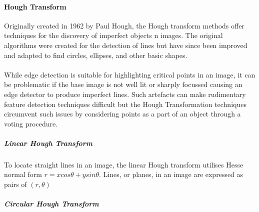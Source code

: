 	\paragraph{Hough Transform}\label{sec:lit_review_hough}
	Originally created in 1962 by Paul Hough, the Hough transform methods offer techniques for the discovery of imperfect objects n images. The original algorithms were created for the detection of lines but have since been improved and adapted to find circles, ellipses, and other basic shapes. 
	\\\\
	While edge detection is suitable for highlighting critical points in an image, it can be problematic if the base image is not well lit or sharply focussed causing an edge detector to produce imperfect lines. Such artefacts can make rudimentary feature detection techniques difficult but the Hough Transformation techniques circumvent such issues by considering points as a part of an object through a voting procedure.
	\subparagraph{Linear Hough Transform}
	To locate straight lines in an image, the linear Hough transform utilises Hesse normal form $r = x cos \theta + y sin \theta$. Lines, or planes, in an image are expressed as pairs of $(r, \theta)$ 
	\subparagraph{Circular Hough Transform}
	
